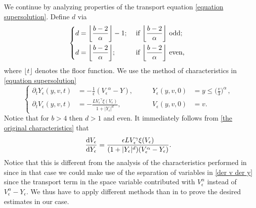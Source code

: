 \documentclass[11pt]{article}
\numberwithin{equation}{section}
\newcommand{\der}{\textup{d}}
\begin{document}
We continue by analyzing properties of the transport equation \eqref{equation supersolution}. Define $d$ via
  \begin{equation}\label{we need function to be even}
\left\{\begin{aligned}
d&=\bigg\lfloor\frac{b-2}{\alpha}\bigg\rfloor-1; &\textup{ if }\bigg\lfloor\frac{b-2}{\alpha}\bigg\rfloor& \textup{ odd; }\\
d&=\bigg\lfloor\frac{b-2}{\alpha}\bigg\rfloor;&\textup{ if }\bigg\lfloor\frac{b-2}{\alpha}\bigg\rfloor& \textup{ even, }
   \end{aligned}\right.
   \end{equation}
   where $\lfloor t \rfloor$ denotes the floor function. We use the method of characteristics in \eqref{equation supersolution}
  \begin{equation}\label{the original characteristics}
\left\{\begin{aligned}
\partial_{t}{Y_{\epsilon}}(y,v,t)&=-\frac{1}{\epsilon}({V_{\epsilon}}^{\alpha}-Y), & \qquad {Y_{\epsilon}}(y,v,0)&=y\leq \big(\frac{v}{3}\big)^{\alpha}\,, \\
\partial_{t}{V_{\epsilon}}(y,v,t)&=-\frac{{L}{V_{\epsilon}}^{\gamma}\xi(V_{\epsilon})}{1+|{Y_{\epsilon}}|^{d}},& \qquad {V_{\epsilon}}(y,v,0)&=v.
   \end{aligned}\right.
   \end{equation}
 Notice that for $b>4$ then $d>1$ and even.  It immediately follows from \eqref{the original characteristics} that
  \begin{align}\label{der v der y}
      \frac{\der V_{\epsilon}}{\der Y_{\epsilon}}=\frac{\epsilon L V_{\epsilon}^{\gamma}\xi(V_{\epsilon})}{(1+|Y_{\epsilon}|^{d})(V_{\epsilon}^{\alpha}-Y_{\epsilon})}.
  \end{align}
 Notice that this is different from the analysis of the characteristics performed in \cite{cristianinhom} since in that case we could make use of the separation of variables in \eqref{der v der y} since the transport term in the space variable  contributed with $V_{\epsilon}^{\alpha}$ instead of $V_{\epsilon}^{\alpha}-Y_{\epsilon}$. We thus have to apply different methods than in \cite{cristianinhom} to prove the desired estimates in our case.
\end{document}

